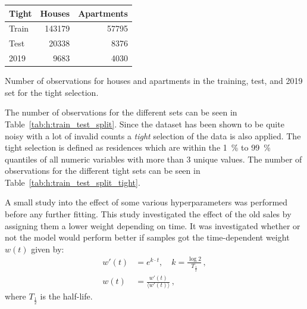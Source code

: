 \begin{margintable}
  \begin{tabular}{lrr}
   Tight      & Houses        & Apartments  \\ \midrule
   Train      & \num{143179}  & \num{57795} \\   
   Test       & \num{20338}   & \num{8376}  \\   
   \num{2019} & \num{9683}    & \num{4030} 
  \end{tabular}
  \vspace{3mm}
  \caption[Number of Observations in the Housing Dataset for the Tight Selection]{\label{tab:h:train_test_split_tight}Number of observations for houses and apartments in the training, test, and \num{2019} set for the tight selection.}
  \vspace{3mm}
\end{margintable}

The number of observations for the different sets can be seen in Table~\ref{tab:h:train_test_split}. Since the dataset has been shown to be quite noisy with a lot of invalid counts a \emph{tight} selection of the data is also applied. The tight selection is defined as residences which are within the \SI{1}{\percent} to \SI{99}{\percent} quantiles of all numeric variables with more than 3 unique values. The number of observations for the different tight sets can be seen in Table~\ref{tab:h:train_test_split_tight}. 

A small study into the effect of some various hyperparameters was performed before any further fitting. This study investigated the effect of the old sales by assigning them a lower weight depending on time. It was investigated whether or not the model would perform better if samples got the time-dependent weight $w(t)$ given by:
\begin{equation}
  \begin{split}
    w'(t) &= e^{ k \cdot t}, \quad k = \frac{\log 2}{T_{\frac{1}{2}}} \, ,\\
    w(t) &= \frac{w'(t)}{\langle w'(t) \rangle} \, ,
  \end{split}
  \label{eg:h:sample_weight}
\end{equation}
where $T_{\frac{1}{2}}$ is the half-life. 

